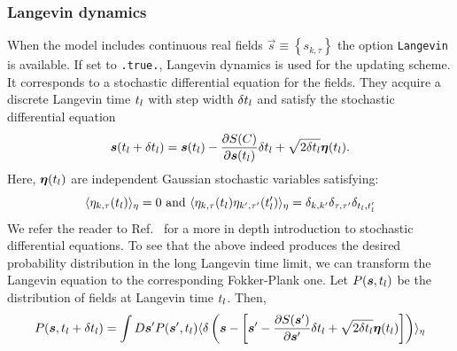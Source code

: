 

\subsubsection{Langevin dynamics}

When the model includes continuous real fields $\vec{s} \equiv \left\{s_{k,\tau} \right\}$ the option \texttt{Langevin} is available. If set to \texttt{.true.}, Langevin dynamics is used for the updating scheme. It  corresponds to a  stochastic differential equation   for the fields. They acquire a discrete Langevin time $t_{l}$ with step width $\delta t_{l}$ and satisfy the stochastic differential equation
\begin{equation}\label{eqn:langevin}
   \boldsymbol{s}(t_{l} +  \delta t_{l})    =    \boldsymbol{s}(t_{l})    - \frac{\partial S(C) }{\partial    \boldsymbol{s}(t_{l}) }    \delta t_{l}     +\sqrt{2 \delta t_{l} } \boldsymbol{\eta}(t_{l}).
\end{equation}
Here,  $  \boldsymbol{\eta}(t_{l})  $   are  independent Gaussian  stochastic variables  satisfying:
\begin{equation}
        \langle  \eta_{k,\tau}(t_{l}) \rangle_{\eta}  = 0   \text{  and  }    \langle  \eta_{k,\tau}(t_{l})  \eta_{k',\tau'}(t_{l}') \rangle_{\eta}  = \delta_{k,k'} \delta_{\tau,\tau'} \delta_{t_{l},t_{l}'}
\end{equation}
We refer the reader to  Ref.~\cite{Gardiner}   for a more in depth introduction to stochastic differential equations.
To see that the above  indeed produces the desired probability distribution in the long Langevin time limit, we can transform the Langevin equation  to the corresponding Fokker-Plank one.  Let
$P(\boldsymbol{s}, t_{l}) $ be the distribution of fields at Langevin time $t_{l}$. Then,
\begin{equation}
        P(\boldsymbol{s}, t_{l}  + \delta t_{l} )    = \int D\boldsymbol{s}'  P  (\boldsymbol{s}', t_{l}  )    \langle    \delta \left(  \boldsymbol{s} - \left[ \boldsymbol{s}'   - \frac{\partial S(\boldsymbol{s}' )}{\partial    \boldsymbol{s}' }   \delta t_{l}     +\sqrt{2 \delta t_{l} } \boldsymbol{\eta}(t_{l})  \right]    \right) \rangle_{\eta}
\end{equation}
